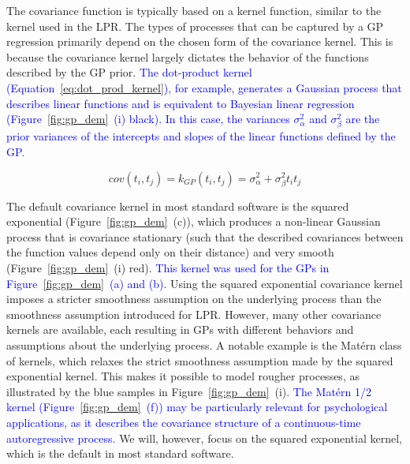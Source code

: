 \documentclass[man, floatsintext]{apa7}
\begin{document}
The covariance function is typically based on a kernel function, similar to the
kernel used in the LPR\@. The types of processes that can be captured by a GP
regression primarily depend on the chosen form of the covariance kernel. This
is because the covariance kernel largely dictates the behavior of the functions
described by the GP prior\@. \textcolor{blue}{The dot-product kernel
  (Equation~\ref{eq:dot_prod_kernel}), for example, generates a Gaussian
  process
  that describes linear functions and is equivalent to Bayesian linear
  regression
  (Figure~\ref{fig:gp_dem}~(i) black). In this case, the variances
  $\sigma_\alpha^2$ and $\sigma_\beta^2$ are the prior variances of
  the
  intercepts and slopes of the linear functions defined by the GP\@.}

\begin{equation}\label{eq:dot_prod_kernel}
  cov(t_i, t_j) = k_{GP}(t_i, t_j) = \sigma_\alpha^2 + \sigma_\beta^2 t_i t_j
\end{equation}

The default covariance kernel in most standard software is the squared
exponential (Figure~\ref{fig:gp_dem}~(c)), which produces a non-linear Gaussian
process that is covariance stationary (such that the described covariances
between the function values depend only on their distance) and very smooth
(Figure~\ref{fig:gp_dem}~(i) red).
\textcolor{blue}{This kernel was used for the GPs in
  Figure~\ref{fig:gp_dem}~(a) and (b). } Using the squared exponential
covariance
kernel imposes a stricter smoothness assumption on the underlying process than
the smoothness assumption introduced for LPR\@. However, many other covariance
kernels are available, each resulting in GPs with different behaviors and
assumptions about the underlying process. A notable example is the Matérn class
of kernels, which relaxes the strict smoothness assumption made by the squared
exponential kernel. This makes it possible to model rougher processes, as
illustrated by the blue samples in Figure~\ref{fig:gp_dem}~(i).
\textcolor{blue}{The Matérn 1/2 kernel (Figure~\ref{fig:gp_dem}~(f)) may be
  particularly relevant for psychological applications, as it describes the
  covariance structure of a continuous-time autoregressive process.} We will,
however, focus on the squared exponential kernel, which is the default in most
standard software.
\end{document}
